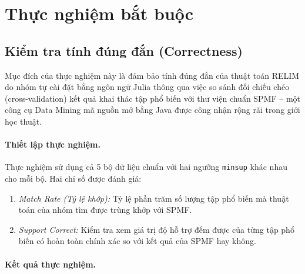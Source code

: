 \documentclass[12pt,a4paper]{report}
\begin{document}
 
\section{Thực nghiệm bắt buộc}
 
\subsection{Kiểm tra tính đúng đắn (Correctness)}

Mục đích của thực nghiệm này là đảm bảo tính đúng đắn của thuật toán RELIM do nhóm
tự cài đặt bằng ngôn ngữ Julia thông qua việc so sánh đối chiếu chéo
(cross-validation) kết quả khai thác tập phổ biến với thư viện chuẩn SPMF --
một công cụ Data Mining mã nguồn mở bằng Java được công nhận rộng rãi trong giới
học thuật.

\paragraph{Thiết lập thực nghiệm.}
Thực nghiệm sử dụng cả 5 bộ dữ liệu chuẩn với hai ngưỡng \texttt{minsup} khác nhau
cho mỗi bộ. Hai chỉ số được đánh giá:
\begin{enumerate}[label=(\roman*)]
    \item \textit{Match Rate (Tỷ lệ khớp):} Tỷ lệ phần trăm số lượng tập phổ biến
          mà thuật toán của nhóm tìm được trùng khớp với SPMF.
    \item \textit{Support Correct:} Kiểm tra xem giá trị độ hỗ trợ đếm được của
          từng tập phổ biến có hoàn toàn chính xác so với kết quả của SPMF hay không.
\end{enumerate}

\paragraph{Kết quả thực nghiệm.}
\end{document}
